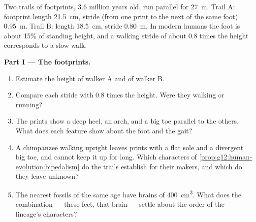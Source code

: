 \begin{problem}
\label{pb:g12:human-evolution:1}
Two trails of footprints, 3.6 million years old, run parallel for
\qty{27}{m}. Trail A: footprint length \qty{21.5}{cm}, stride (from one
print to the next of the same foot) \qty{0.95}{m}. Trail B: length
\qty{18.5}{cm}, stride \qty{0.80}{m}. In modern humans the foot is
about 15\% of standing height, and a walking stride of about 0.8 times
the height corresponds to a slow walk.

\medskip
\noindent\textbf{Part I --- The footprints.}
\begin{enumerate}
  \item Estimate the height of walker A and of walker B.
  \item Compare each stride with 0.8 times the height. Were they
        walking or running?
  \item The prints show a deep heel, an arch, and a big toe parallel
        to the others. What does each feature show about the foot and
        the gait?
  \item A chimpanzee walking upright leaves prints with a flat sole and
        a divergent big toe, and cannot keep it up for long. Which
        characters of \cref{prop:g12:human-evolution:bipedalism} do
        the trails establish for their makers, and which do they leave
        unknown?
  \item The nearest fossils of the same age have brains of
        \qty{400}{cm^3}. What does the combination --- these feet, that
        brain --- settle about the order of the lineage's characters?
\end{enumerate}


\end{problem}
